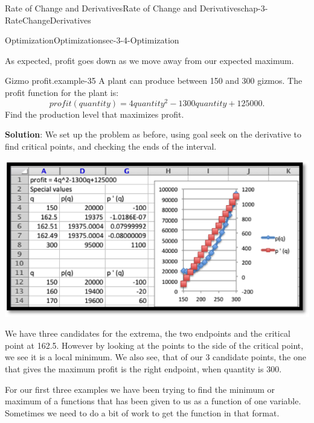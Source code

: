 \documentclass[oneside,10pt,]{book}
\newcommand{\terminology}[1]{\textbf{#1}}
\numberwithin{equation}{section}
\begin{document}
\begin{chapterptx}{Rate of Change and Derivatives}{}{Rate of Change and Derivatives}{}{}{chap-3-RateChangeDerivatives}
\begin{sectionptx}{Optimization}{}{Optimization}{}{}{sec-3-4-Optimization}
\begin{sidebyside}{1}{0.25}{0.25}{0}
\begin{sbspanel}{0.5}
\end{sbspanel}%
\end{sidebyside}%
\par
\hypertarget{p-1217}{}%
As expected, profit goes down as we move away from our expected maximum.%
\begin{example}{Gizmo profit.}{example-35}%
\hypertarget{p-1218}{}%
A plant can produce between 150 and 300 gizmos.  The profit function for the plant is:%
%
\begin{equation*}
profit(quantity)=4 quantity^2-1300 quantity+125000.
\end{equation*}
\hypertarget{p-1219}{}%
Find the production level that maximizes profit.%
\par
\hypertarget{p-1220}{}%
\terminology{Solution}: We set up the problem as before, using goal seek on the derivative to find critical points, and checking the ends of the interval.%
\begin{sidebyside}{1}{0.15}{0.15}{0}%
\begin{sbspanel}{0.7}%
\includegraphics[width=1\linewidth]{images/sec3-4-6.png}
\end{sbspanel}%
\end{sidebyside}%
\par
\hypertarget{p-1221}{}%
We have three candidates for the extrema, the two endpoints and the critical point at 162.5.  However by looking at the points to the side of the critical point, we see it is a local minimum.  We also see, that of our 3 candidate points, the one that gives the maximum profit is the right endpoint, when quantity is 300.%
\par
\hypertarget{p-1222}{}%
For our first three examples we have been trying to find the minimum or maximum of a functions that has been given to us as a function of one variable.  Sometimes we need to do a bit of work to get the function in that format.%
\end{example}

\end{sectionptx}
\end{chapterptx}
\end{document}
